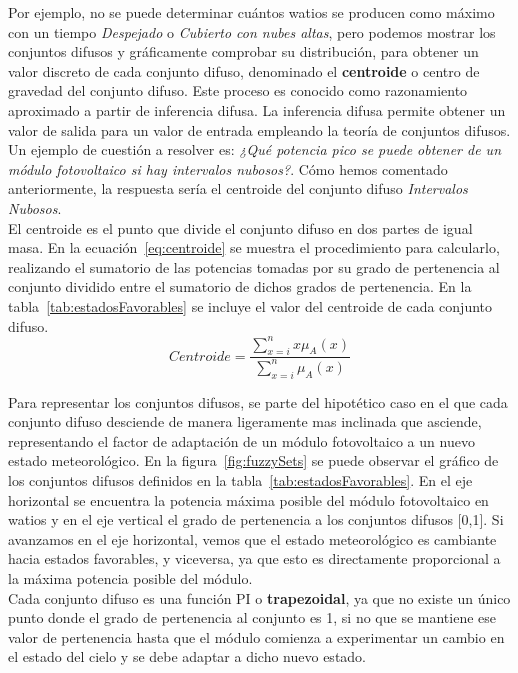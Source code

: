 Por ejemplo, no se puede determinar cuántos watios se producen como máximo con un tiempo \textit{Despejado} o \textit{Cubierto con nubes altas}, pero podemos mostrar los conjuntos difusos y gráficamente comprobar su distribución, para obtener un valor discreto de cada conjunto difuso, denominado el \textbf{centroide} o centro de gravedad del conjunto difuso. Este proceso es conocido como razonamiento aproximado a partir de inferencia difusa. La inferencia difusa permite obtener un valor de salida para un valor de entrada empleando la teoría de conjuntos difusos.\\Un ejemplo de cuestión a resolver es: \textit{¿Qué potencia pico se puede obtener de un módulo fotovoltaico si hay intervalos nubosos?}. Cómo hemos comentado anteriormente, la respuesta sería el centroide del conjunto difuso \textit{Intervalos Nubosos}.\\El centroide es el punto que divide el conjunto difuso en dos partes de igual masa. En la ecuación~\ref{eq:centroide} se muestra el procedimiento para calcularlo, realizando el sumatorio de las potencias tomadas por su grado de pertenencia al conjunto dividido entre el sumatorio de dichos grados de pertenencia. En la tabla~\ref{tab:estadosFavorables} se incluye el valor del centroide de cada conjunto difuso.\\
\begin{equation}
        \label{eq:centroide}
        Centroide = \frac{\sum_{x=i}^{n} x \mu_{A}(x)}{\sum_{x=i}^{n} \mu_{A}(x)}
\end{equation}

Para representar los conjuntos difusos, se parte del hipotético caso en el que cada conjunto difuso desciende de manera ligeramente mas inclinada que asciende, representando el factor de adaptación de un módulo fotovoltaico a un nuevo estado meteorológico. En la figura~\ref{fig:fuzzySets} se puede observar el gráfico de los conjuntos difusos definidos en la tabla~\ref{tab:estadosFavorables}. En el eje horizontal se encuentra la potencia máxima posible del módulo fotovoltaico en watios y en el eje vertical el grado de pertenencia a los conjuntos difusos [0,1]. Si avanzamos en el eje horizontal, vemos que el estado meteorológico es cambiante hacia estados favorables, y viceversa, ya que esto es directamente proporcional a la máxima potencia posible del módulo.\\

Cada conjunto difuso es una función PI o \textbf{trapezoidal}, ya que no existe un único punto donde el grado de pertenencia al conjunto es 1, si no que se mantiene ese valor de pertenencia hasta que el módulo comienza a experimentar un cambio en el estado del cielo y se debe adaptar a dicho nuevo estado.


